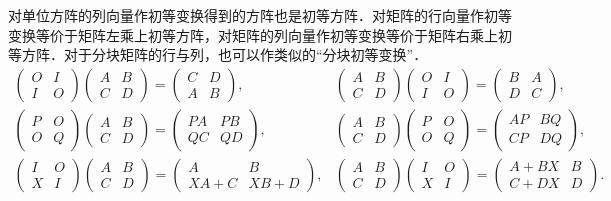 \documentclass[a4paper,fontset=windows]{ctexbook}
\theoremstyle{definition}
\begin{document}
对单位方阵的列向量作初等变换得到的方阵也是初等方阵．对矩阵的行向量作初等变换等价于矩阵左乘上初等方阵，对矩阵的列向量作初等变换等价于矩阵右乘上初等方阵．对于分块矩阵的行与列，也可以作类似的“分块初等变换”．
$$\begin{array}{ll}
\begin{pmatrix}O&I \\ I&O\end{pmatrix}\begin{pmatrix}A&B \\ C&D\end{pmatrix}=\begin{pmatrix}C&D \\ A&B\end{pmatrix},
&\begin{pmatrix}A&B \\ C&D\end{pmatrix}\begin{pmatrix}O&I \\ I&O\end{pmatrix}=\begin{pmatrix}B&A \\ D&C\end{pmatrix}, \\
\begin{pmatrix}P&O \\ O&Q\end{pmatrix}\begin{pmatrix}A&B \\ C&D\end{pmatrix}=\begin{pmatrix}PA&PB \\ QC&QD\end{pmatrix},
&\begin{pmatrix}A&B \\ C&D\end{pmatrix}\begin{pmatrix}P&O \\ O&Q\end{pmatrix}=\begin{pmatrix}AP&BQ \\ CP&DQ\end{pmatrix}, \\
\begin{pmatrix}I&O \\ X&I\end{pmatrix}\begin{pmatrix}A&B \\ C&D\end{pmatrix}=\begin{pmatrix}A&B \\ XA+C&XB+D\end{pmatrix},
&\begin{pmatrix}A&B \\ C&D\end{pmatrix}\begin{pmatrix}I&O \\ X&I\end{pmatrix}=\begin{pmatrix}A+BX&B \\ C+DX&D\end{pmatrix}.
\end{array}$$
\end{document}
